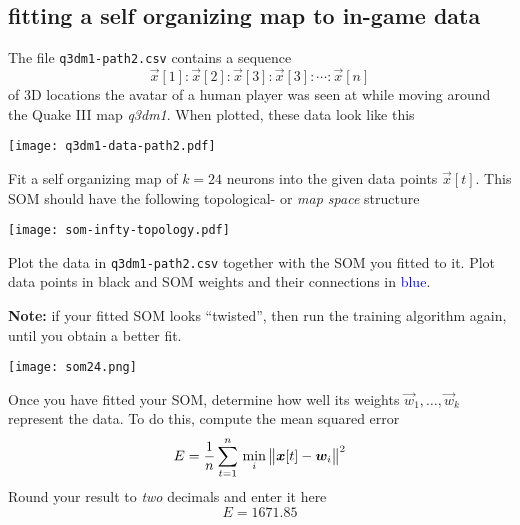 
\color{black}
\subsection*{fitting a self organizing map to in-game data}
The file \texttt{q3dm1-path2.csv} contains a sequence 
\begin{equation*}
\vec{x}[1]:\vec{x}[2]:\vec{x}[3]:\vec{x}[3]:\cdots:\vec{x}[n]
\end{equation*}
of 3D locations the avatar of a human player was seen at while moving around the Quake III map \textit{q3dm1}. When plotted, these data look like this
\begin{center}
\texttt{[image: q3dm1-data-path2.pdf]}
\end{center}

Fit a self organizing map of $k=24$ neurons into the given data points $\vec{x}[t]$. This SOM should have the following topological- or \emph{map space} structure
\begin{center}
\texttt{[image: som-infty-topology.pdf]}
\end{center}
\newpage





Plot the data in \texttt{q3dm1-path2.csv} together with the SOM you fitted to it. Plot data points in black and SOM weights and their connections in \textcolor{blue}{blue}.

\textbf{Note:} if your fitted SOM looks ``twisted'', then run the training algorithm again, until you obtain a better fit.
\begin{center}
\texttt{[image: som24.png]}
\end{center}





\vspace{2cm}
Once you have fitted your SOM, determine how well its weights $\vec{w}_1, \ldots, \vec{w}_k$ represent the data. To do this, compute the mean squared error
\begin{equation*}
E = \frac{1}{n} \sum_{t=1}^n \, \min_i \, \bigl \lVert \bm{x}[t] - \bm{w}_i \bigr \rVert^2
\end{equation*}
Round your result to \emph{two} decimals and enter it here \color{blue}
\begin{equation*}
E = 1671.85
\end{equation*}
\color{black}
\newpage